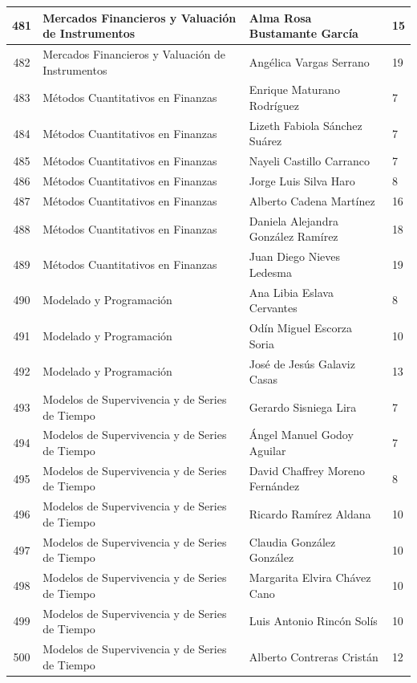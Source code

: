 {\begin{longtable}{|c|p{6.5cm}|p{5cm}|p{1.5cm}|}
  481 & Mercados Financieros y Valuación de Instrumentos & Alma Rosa Bustamante García & 15 \\ \hline
  482 & Mercados Financieros y Valuación de Instrumentos & Angélica Vargas Serrano & 19 \\ \hline
  483 & Métodos Cuantitativos en Finanzas & Enrique Maturano Rodríguez & 7 \\ \hline
  484 & Métodos Cuantitativos en Finanzas & Lizeth Fabiola Sánchez Suárez & 7 \\ \hline
  485 & Métodos Cuantitativos en Finanzas & Nayeli Castillo Carranco & 7 \\ \hline
  486 & Métodos Cuantitativos en Finanzas & Jorge Luis Silva Haro & 8 \\ \hline
  487 & Métodos Cuantitativos en Finanzas & Alberto Cadena Martínez & 16 \\ \hline
  488 & Métodos Cuantitativos en Finanzas & Daniela Alejandra González Ramírez & 18 \\ \hline
  489 & Métodos Cuantitativos en Finanzas & Juan Diego Nieves Ledesma & 19 \\ \hline
  490 & Modelado y Programación & Ana Libia Eslava Cervantes & 8 \\ \hline
  491 & Modelado y Programación & Odín Miguel Escorza Soria & 10 \\ \hline
  492 & Modelado y Programación & José de Jesús Galaviz Casas & 13 \\ \hline
  493 & Modelos de Supervivencia y de Series de Tiempo & Gerardo Sisniega Lira & 7 \\ \hline
  494 & Modelos de Supervivencia y de Series de Tiempo & Ángel Manuel Godoy Aguilar & 7 \\ \hline
  495 & Modelos de Supervivencia y de Series de Tiempo & David Chaffrey Moreno Fernández & 8 \\ \hline
  496 & Modelos de Supervivencia y de Series de Tiempo & Ricardo Ramírez Aldana & 10 \\ \hline
  497 & Modelos de Supervivencia y de Series de Tiempo & Claudia González González & 10 \\ \hline
  498 & Modelos de Supervivencia y de Series de Tiempo & Margarita Elvira Chávez Cano & 10 \\ \hline
  499 & Modelos de Supervivencia y de Series de Tiempo & Luis Antonio Rincón Solís & 10 \\ \hline
  500 & Modelos de Supervivencia y de Series de Tiempo & Alberto Contreras Cristán & 12 \\ \hline

\end{longtable}}
